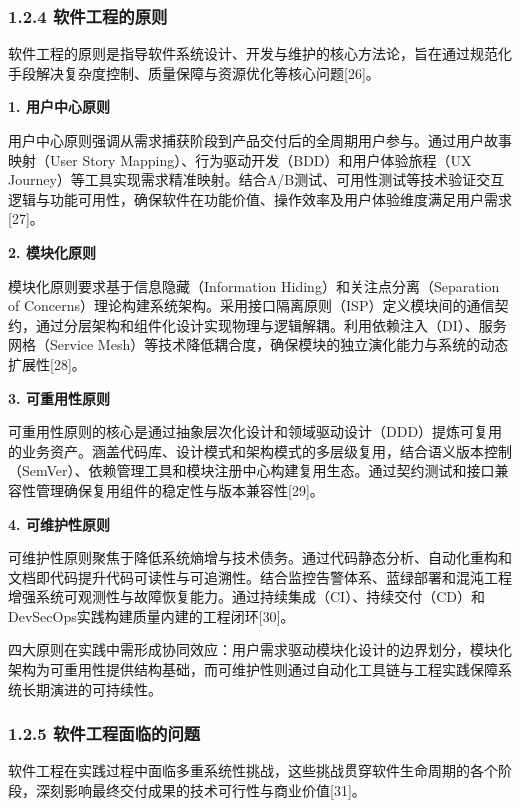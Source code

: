 \documentclass[12pt,a4paper]{article}
\begin{document}
\subsubsection{1.2.4
软件工程的原则}\label{ux8f6fux4ef6ux5de5ux7a0bux7684ux539fux5219}

软件工程的原则是指导软件系统设计、开发与维护的核心方法论，旨在通过规范化手段解决复杂度控制、质量保障与资源优化等核心问题{[}26{]}。

\textbf{1. 用户中心原则}

用户中心原则强调从需求捕获阶段到产品交付后的全周期用户参与。通过用户故事映射（User
Story Mapping）、行为驱动开发（BDD）和用户体验旅程（UX
Journey）等工具实现需求精准映射。结合A/B测试、可用性测试等技术验证交互逻辑与功能可用性，确保软件在功能价值、操作效率及用户体验维度满足用户需求{[}27{]}。

\textbf{2. 模块化原则}

模块化原则要求基于信息隐藏（Information Hiding）和关注点分离（Separation
of
Concerns）理论构建系统架构。采用接口隔离原则（ISP）定义模块间的通信契约，通过分层架构和组件化设计实现物理与逻辑解耦。利用依赖注入（DI）、服务网格（Service
Mesh）等技术降低耦合度，确保模块的独立演化能力与系统的动态扩展性{[}28{]}。

\textbf{3. 可重用性原则}

可重用性原则的核心是通过抽象层次化设计和领域驱动设计（DDD）提炼可复用的业务资产。涵盖代码库、设计模式和架构模式的多层级复用，结合语义版本控制（SemVer）、依赖管理工具和模块注册中心构建复用生态。通过契约测试和接口兼容性管理确保复用组件的稳定性与版本兼容性{[}29{]}。

\textbf{4. 可维护性原则}

可维护性原则聚焦于降低系统熵增与技术债务。通过代码静态分析、自动化重构和文档即代码提升代码可读性与可追溯性。结合监控告警体系、蓝绿部署和混沌工程增强系统可观测性与故障恢复能力。通过持续集成（CI）、持续交付（CD）和DevSecOps实践构建质量内建的工程闭环{[}30{]}。

四大原则在实践中需形成协同效应：用户需求驱动模块化设计的边界划分，模块化架构为可重用性提供结构基础，而可维护性则通过自动化工具链与工程实践保障系统长期演进的可持续性。

\subsubsection{1.2.5
软件工程面临的问题}\label{ux8f6fux4ef6ux5de5ux7a0bux9762ux4e34ux7684ux95eeux9898}

软件工程在实践过程中面临多重系统性挑战，这些挑战贯穿软件生命周期的各个阶段，深刻影响最终交付成果的技术可行性与商业价值{[}31{]}。
\end{document}
